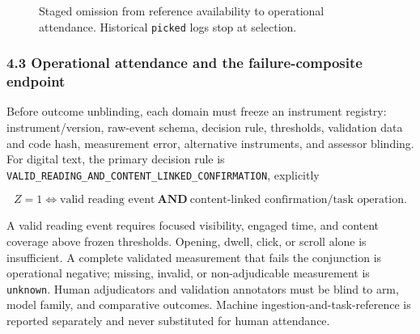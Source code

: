 \documentclass[
  11pt]{article}
\begin{document}
\begin{figure}[htbp]
\centering
{}
\caption{Staged omission from reference availability to operational attendance. Historical \texttt{picked} logs stop at selection.}
\label{fig:omission-stages}
\end{figure}

\subsubsection{4.3 Operational attendance and the failure-composite
endpoint}\label{operational-attendance-and-the-failure-composite-endpoint}

Before outcome unblinding, each domain must freeze an instrument
registry: instrument/version, raw-event schema, decision rule,
thresholds, validation data and code hash, measurement error,
alternative instruments, and assessor blinding. For digital text, the
primary decision rule is
\texttt{VALID\_READING\_AND\_CONTENT\_LINKED\_CONFIRMATION}, explicitly

\[Z=1\iff \text{valid reading event}\ \mathbf{AND}\ \text{content-linked confirmation/task operation}.\]

A valid reading event requires focused visibility, engaged time, and
content coverage above frozen thresholds. Opening, dwell, click, or
scroll alone is insufficient. A complete validated measurement that
fails the conjunction is operational negative; missing, invalid, or
non-adjudicable measurement is \texttt{unknown}. Human adjudicators and
validation annotators must be blind to arm, model family, and
comparative outcomes. Machine ingestion-and-task-reference is reported
separately and never substituted for human attendance.
\end{document}
